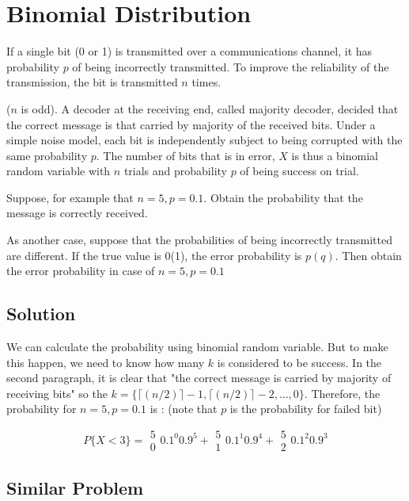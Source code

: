 \documentclass[12pt,a4paper]{article}
\begin{document}
\section{Binomial Distribution}

If a single bit (0 or 1) is transmitted over a communications channel, it has probability $p$ of being incorrectly transmitted. To improve the reliability of the transmission, the bit is transmitted $n$ times.

($n$ is odd). A decoder at the receiving end, called majority decoder, decided that the correct message is that carried by majority of the received bits. Under a simple noise model, each bit is independently subject to being corrupted with the same probability $p$. The number of bits that is in error, $X$ is thus a binomial random variable with $n$ trials and probability $p$ of being success on trial. 

Suppose, for example that $n=5, p=0.1$. Obtain the probability that the message is correctly received.

As another case, suppose that the probabilities of being incorrectly transmitted are different. If the true value is 0(1), the error probability is $p(q)$. Then obtain the error probability in case of $n=5, p=0.1$



\subsection{Solution}

We can calculate the probability using binomial random variable. But to make this happen, we need to know how many $k$ is considered to be success. In the second paragraph, it is clear that "the correct message is carried by majority of receiving bits" so the $k = \{\lceil (n/2) \rceil - 1,\lceil (n/2) \rceil - 2, \dots, 0\}$. Therefore, the probability for $n=5, p=0.1$ is : (note that $p$ is the probability for failed bit)

\[
P\{X < 3\} = \begin{array}{c}5\\0\end{array} 0.1^0 0.9^5 + \begin{array}{c}5\\1\end{array} 0.1^1 0.9^4 + \begin{array}{c}5\\2\end{array} 0.1^2 0.9^3
\]
\subsection{Similar Problem}
\end{document}

